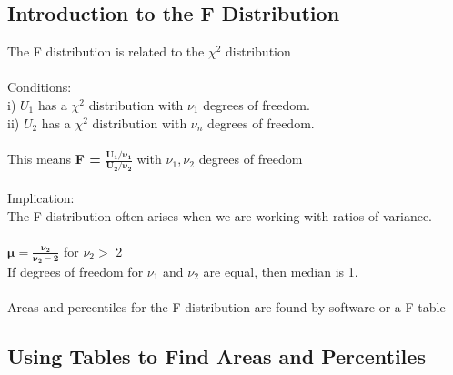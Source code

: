 \documentclass[12pt, a4paper]{article}
\begin{document}
	\subsection{Introduction to the F Distribution}
	The F distribution is related to the $\chi^2$ distribution \\~\\
	Conditions: \\
	i) $U_1$ has a $\chi^2$ distribution with $\nu_1$ degrees of freedom. \\
	ii) $U_2$ has a $\chi^2$ distribution with $\nu_n$ degrees of freedom. \\~\\
	This means \large \textbf{F = } $\mathbf{\frac{U_1/ \nu_1}{U_2/ \nu_2}}$ \normalsize with $\nu_1, \nu_2$ degrees of freedom \\~\\
	Implication: \\
	The F distribution often arises when we are working with ratios of variance. \\~\\
	$\mathbf{\mu = \frac{\nu_2}{\nu_2 - 2}}$ for $\nu_2 >$ 2 \\
	If degrees of freedom for $\nu_1$ and $\nu_2$ are equal, then median is 1. \\~\\
	Areas and percentiles for the F distribution are found by software or a F table \newpage
	

\begin{center} \section{Using Tables to Find Areas and Percentiles} \end{center}
\end{document}

